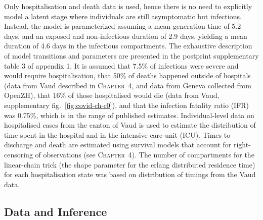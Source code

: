 Only hospitalisation and death data is used, hence there is no need to explicitly model a latent stage where individuals are still asymptomatic but infectious\cite[-8\baselineskip]{Ganyani:EstimatingGenerationInterval:2020,He:TemporalDynamicsViral:2020, Liu:ContributionPresymptomaticInfection:2020}. Instead, the model is parameterized assuming a mean generation time of 5.2 days\cite[-2\baselineskip]{Ganyani:EstimatingGenerationInterval:2020}, and an exposed and non-infectious duration of 2.9 days\cite{He:TemporalDynamicsViral:2020}, yielding a mean duration of 4.6 days in the infectious compartments. The exhaustive description of model transitions and parameters are presented in the postprint supplementary table 3 of appendix 1. It is assumed that 7.5\% of infections were severe and would require hospitalisation, that 50\% of deaths happened outside of hospitals (data from Vaud described in \textsc{Chapter~4}, and data from Geneva collected from OpenZH), that 16\% of those hospitalised would die (data from Vaud, supplementary fig.~\ref{fig:covid-ch-r0}), and that the infection fatality ratio (IFR) was 0.75\%, which is in the range of published estimates\cite[-4\baselineskip]{Verity:EstimatesSeverityCoronavirus:2020, Russell:EstimatingInfectionCase:2020}. Individual-level data on hospitalised cases from the canton of Vaud is used to estimate the distribution of time spent in the hospital and in the intensive care unit (ICU). Times to discharge and death are estimated using survival models that account for right-censoring of observations (see \textsc{Chapter~4}). The number of compartments for the linear-chain trick (\ie the shape parameter for the erlang distributed residence time)  for each hospitalisation state was based on distribution of timings from the Vaud data. 
\subsection{Data and Inference} 
